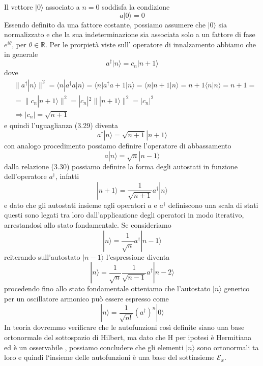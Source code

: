 Il vettore $|0\rangle $ associato a $n=0$ soddisfa la condizione 
\begin{equation*}
	a |0 \rangle = 0 
\end{equation*}
Essendo definito da una fattore costante, possiamo assumere che $|0 \rangle $ sia normalizzato e che la sua indeterminazione sia associata solo a un fattore di fase $e^{i\theta}$, per $\theta \in \mathbb{R}$. Per le prorpiet\`a viste sull'
operatore di innalzamento abbiamo che in generale
\begin{equation}
	a^\dag |n\rangle = c_n |n+1 \rangle
\end{equation}
dove 
\begin{align*}
	& \|a^\dag | n \rangle \|^2 = \langle n | a^\dag a | n \rangle = \langle n| a^\dag a +1 | n \rangle = \langle n| n+1 |n \rangle =n+1 \langle n | n \rangle = n+1 =\\[0.5cm]
	& =\|c_n|n+1 \rangle \|^2 = |c_n|^2\||n+1 \rangle \|^2 = |c_n|^2 \\[0.5cm]
	& \Rightarrow |c_n| = \sqrt{n+1}
\end{align*}
e quindi l'uguaglianza (3.29) diventa 
\begin{equation}
	a^\dag |n \rangle = \sqrt{n+1}|n+1 \rangle 
\end{equation}
con analogo procedimento possiamo definire l'operatore di abbassamento
\begin{equation*}
	a|n\rangle = \sqrt{n}|n-1 \rangle 
\end{equation*}
dalla relazione (3.30) possiamo definire la forma degli autostati in funzione dell'operatore $a^\dag$, infatti
\begin{equation*}
	|n + 1 \rangle = \frac{1}{\sqrt{n+1}}a^\dag |n \rangle 
\end{equation*}
e dato che gli autostati insieme agli operatori $a$ e $a^\dag$ definiscono una scala di stati questi sono legati tra loro dall'applicazione degli operatori in modo iterativo, arrestandosi allo stato fondamentale. Se consideriamo
\begin{equation*}
	|n \rangle = \frac{1}{\sqrt{n}}a^\dag |n-1 \rangle 
\end{equation*} 
reiterando sull'autostato $|n-1 \rangle $ l'espressione diventa
\begin{equation*}
|n \rangle = \frac{1}{\sqrt{n}} \frac{1}{\sqrt{n-1}}a^\dag |n-2 \rangle
\end{equation*}
procedendo fino allo stato fondamentale otteniamo che l'autostato $|n \rangle$ generico per un oscillatore armonico pu\`o essere espresso come 
\begin{equation}
	|n \rangle = \frac{1}{\sqrt{n!}}(a^\dag)^n|0\rangle 
\end{equation}
In teoria dovremmo verificare che le autofunzioni cos\`i definite siano una base ortonormale del sottospazio di Hilbert, ma dato che H per ipotesi \`e Hermitiana ed \`e un osservabile , possiamo concludere che gli elementi $|n\rangle$ sono ortonormali ta loro e quindi l`insieme delle autofunzioni \`e una base del sottinsieme $\mathcal{E}_{x}$.


